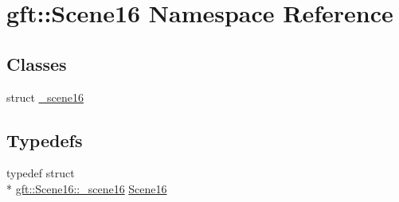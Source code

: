 \hypertarget{namespacegft_1_1Scene16}{\section{gft\-:\-:Scene16 Namespace Reference}
\label{namespacegft_1_1Scene16}
}
\subsection*{Classes}
\begin{DoxyCompactItemize}
\item 
struct \hyperlink{structgft_1_1Scene16_1_1__scene16}{\-\_\-scene16}
\end{DoxyCompactItemize}
\subsection*{Typedefs}
\begin{DoxyCompactItemize}
\item 
typedef struct \\*
\hyperlink{structgft_1_1Scene16_1_1__scene16}{gft\-::\-Scene16\-::\-\_\-scene16} \hyperlink{namespacegft_1_1Scene16_a5a4b9571f9e3e6e1393f03bc708bf5ae}{Scene16}
\end{DoxyCompactItemize}
